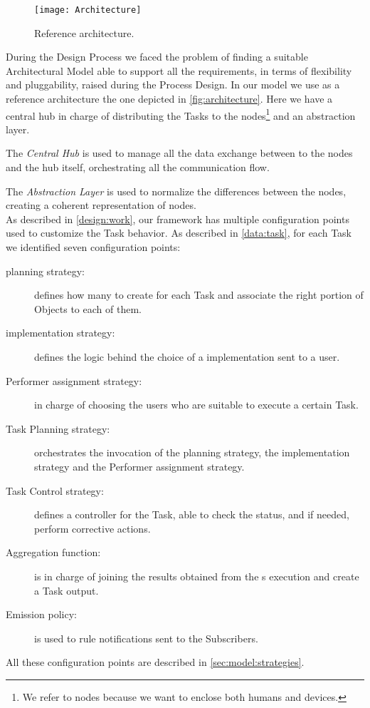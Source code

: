 \begin{figure}[htb]
	\centering
	\texttt{[image: Architecture]}
	\caption{Reference architecture.}
	\label{fig:architecture}
\end{figure}

During the Design Process we faced the problem of finding a suitable Architectural
Model able to support all the requirements, in terms of flexibility and pluggability,
raised during the Process Design. In our model we use as a reference architecture
the one depicted in \autoref{fig:architecture}. Here we have a central hub
in charge of distributing the Tasks to the nodes\footnote{We refer to nodes
because we want to enclose both humans and devices.} and an abstraction layer.

The \emph{Central Hub} is used to manage all the data exchange between to the
nodes and the hub itself, orchestrating all the communication flow.

The \emph{Abstraction Layer} is used to normalize the differences between the
nodes, creating a coherent representation of nodes.\\




As described in \ref{design:work}, our framework has multiple configuration
points used to customize the Task behavior. As described in \vref{data:task},
for each Task we identified seven configuration points:
\begin{description}
	\item[\utask{} planning strategy:] defines how many \utask{} to create for
	each Task and associate the right portion of Objects to each of them.
	\item[\utask{} implementation strategy:] defines the logic behind the choice
	of a \utask{} implementation sent to a user.
	\item[Performer assignment strategy:] in charge of choosing the users who
	are suitable to execute a certain Task.
	\item[Task Planning strategy:] orchestrates the invocation of the \utask{}
	planning strategy, the \utask{} implementation strategy and the Performer
	assignment strategy.
	\item[Task Control strategy:] defines a controller for the Task, able to
	check the status, and if needed, perform corrective actions.
	\item[Aggregation function:] is in charge of joining the results obtained
	from the \utask{}s execution and create a Task output.
	\item[Emission policy:] is used to rule notifications sent to the Subscribers.
\end{description}
All these configuration points are described in \ref{sec:model:strategies}.